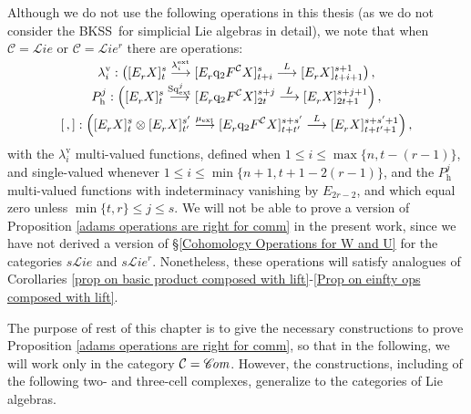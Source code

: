 \documentclass[11pt]{amsart} \renewcommand{\baselinestretch}{1.2}
\theoremstyle{plain}
\numberwithin{equation}{section} %
\theoremstyle{plain}
\numberwithin{equation}{chapter} %
\renewcommand{\to}{\longrightarrow}
\newcommand{\scrL}{\mathscr{L}}
\newcommand{\scrC}{\mathscr{C}}
\newcommand{\calc}{\mathcal{C}}
\newcommand{\quadgrad}[1]{\mathrm{q}_{#1}}
\newcommand{\Sq}{\mathrm{Sq}}
\newcommand{\algs}{{\scrC\!\textit{\normalfont\textit{om}}}}
\newcommand{\liealgs}{{\scrL\!\textit{ie}}}
\newcommand{\restliealgs}{{\scrL\!\textit{ie}^\textit{r}}}
\newcommand{\Edownup}[5]{[E_{#1}^{#2}#3]^{#4}_{#5}}
\newcommand{\uver}{^\mathrm{v}}
\newcommand{\dhor}{_\mathrm{h}}
\newcommand{\lambdav}{\lambda\uver}
\newcommand{\Ph}{P\dhor}
\newcommand{\BKSS}{BKSS}
\begin{document}
\begin{Operations on the Bousfield-Kan spectral sequence}
Although we do not use the following operations in this thesis (as we do not consider the \BKSS\ for simplicial Lie algebras in detail), we note that when $\calc=\liealgs$ or $\calc=\restliealgs$ there are operations:
\begin{gather*}
\lambdav_i:\left(\Edownup{r}{}{X}{s}{t} \smash{{}\overset{\lambda_i^\textup{ext}}{\to}{}} \Edownup{r}{}{\quadgrad{2}F^\calc X}{s}{t+i}\smash{{}\overset{L}{\to} {}}
\Edownup{r}{}{X}{s+1}{t+i+1}\right),
\\
\Ph^{j}:\left(\Edownup{r}{}{X}{s}{t}   \smash{{}\overset{\Sq^j_\textup{ext}}{\to}{}} \Edownup{r}{}{\quadgrad{2}F^\calc X}{s+j}{2t}\smash{{}\overset{L}{\to} {}}
\Edownup{r}{}{X}{s+j+1}{2t+1}\right),\\
[\,,]:\left(\Edownup{r}{}{X}{s}{t}\otimes \Edownup{r}{}{X}{s'}{t'}\smash{{}\overset{\mu_\textup{ext}}{\to}{}} \Edownup{r}{}{\quadgrad{2}F^\calc X}{s+s'}{t+t'}\smash{{}\overset{L}{\to} {}}
\Edownup{r}{}{X}{s+s'+1}{t+t'+1}\right),
\end{gather*}
with the $\lambdav_i$  multi-valued functions,  defined when $1\leq i\leq \max\{n,t-(r-1)\}$, and single-valued whenever $1\leq i\leq\min\{n+1,t+1-2(r-1)\}$, and the $\Ph^j$  multi-valued functions with indeterminacy vanishing by $E_{2r-2}$, and which equal zero unless $\min\{t,r\}\leq j\leq s$. We will not be able to prove a version of Proposition \ref{adams operations are right for comm} in the present work, since we have not derived a version of \S\ref{Cohomology Operations for W and U} for the categories $s\liealgs$ and $s\restliealgs$. Nonetheless, these operations will satisfy analogues of Corollaries \ref{prop on basic product composed with lift}-\ref{Prop on einfty ops composed with lift}.

The purpose of rest of this chapter is to give the necessary constructions to  prove Proposition \ref{adams operations are right for comm}, so that in the following, we will work only in the category $\calc=\algs$. However, the constructions, including of the following two- and three-cell complexes, generalize to the categories of Lie algebras.




\end{Operations on the Bousfield-Kan spectral sequence}
\end{document}
